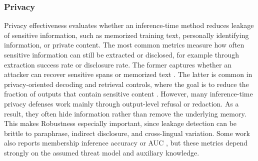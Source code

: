\subsubsection{Privacy}
Privacy effectiveness evaluates whether an inference-time method reduces leakage of sensitive information, such as memorized training text, personally identifying information, or private content. The most common metrics measure how often sensitive information can still be extracted or disclosed, for example through extraction success rate or disclosure rate. The former captures whether an attacker can recover sensitive spans or memorized text \citep{pawelczyk2023context, DBLP:conf/inlg/IppolitoTNZJLCC23, Borec2024TheUI, yan2025dual}. The latter is common in privacy-oriented decoding and retrieval controls, where the goal is to reduce the fraction of outputs that contain sensitive content \citep{Wang2025PrivacyAwareDM, Ok2024DecodingWL, Wei2024PrivacyRO, zou2025poisonedrag}. However, many inference-time privacy defenses work mainly through output-level refusal or redaction. As a result, they often hide information rather than remove the underlying memory. This makes Robustness especially important, since leakage detection can be brittle to paraphrase, indirect disclosure, and cross-lingual variation. Some work also reports membership inference accuracy or AUC \citep{zou2025poisonedrag, nakka2025piijailbreaking}, but these metrics depend strongly on the assumed threat model and auxiliary knowledge.

